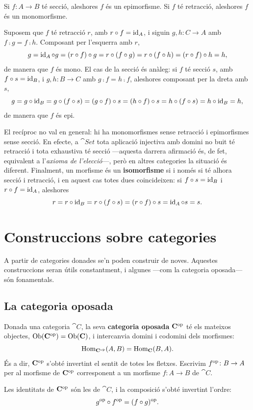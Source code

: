 \begin{proposicio}
Si $f\colon A\to B$ té secció, aleshores $f$ és un epimorfisme. Si $f$ té retracció, aleshores $f$ és un monomorfisme.
\end{proposicio}

\begin{prova}
Suposem que $f$ té retracció $r$, amb $r\circ f=\operatorname{id}_A$, i siguin $g,h\colon C\to A$ amb $f\comp g=f\comp h$. Composant per l'esquerra amb $r$,
\[
g=\operatorname{id}_A\circ g=(r\circ f)\circ g=r\circ(f\circ g)=r\circ(f\circ h)=(r\circ f)\circ h=h,
\]
de manera que $f$ és mono. El cas de la secció és anàleg: si $f$ té secció $s$, amb $f\circ s=\operatorname{id}_B$, i $g,h\colon B\to C$ amb $g\comp f=h\comp f$, aleshores composant per la dreta amb $s$,
\[
g=g\circ\operatorname{id}_B=g\circ(f\circ s)=(g\circ f)\circ s=(h\circ f)\circ s=h\circ(f\circ s)=h\circ\operatorname{id}_B=h,
\]
de manera que $f$ és epi.
\end{prova}

\begin{observacio}
El recíproc no val en general: hi ha monomorfismes sense retracció i epimorfismes sense secció. En efecte, a $\cat{Set}$ tota aplicació injectiva amb domini no buit té retracció i tota exhaustiva té secció ---aquesta darrera afirmació és, de fet, equivalent a l'\emph{axioma de l'elecció}---, però en altres categories la situació és diferent. Finalment, un morfisme és un \textbf{isomorfisme} si i només si té alhora secció i retracció, i en aquest cas totes dues coincideixen: si $f\circ s=\operatorname{id}_B$ i $r\circ f=\operatorname{id}_A$, aleshores
\[
r=r\circ\operatorname{id}_B=r\circ(f\circ s)=(r\circ f)\circ s=\operatorname{id}_A\circ s=s.
\]
\end{observacio}

\section{Construccions sobre categories}

A partir de categories donades se'n poden construir de noves. Aquestes construccions seran útils constantment, i algunes ---com la categoria oposada--- són fonamentals.

\subsection{La categoria oposada}

\begin{definicio}
Donada una categoria $\cat{C}$, la seva \textbf{categoria oposada} $\mathbf{C}^{\mathrm{op}}$ té els mateixos objectes, $\operatorname{Ob}(\mathbf{C}^{\mathrm{op}})=\operatorname{Ob}(\mathbf{C})$, i intercanvia domini i codomini dels morfismes:
\[
\operatorname{Hom}_{\mathbf{C}^{\mathrm{op}}}(A,B)=\operatorname{Hom}_{\mathbf{C}}(B,A).
\]
És a dir, $\mathbf{C}^{\mathrm{op}}$ s'obté invertint el sentit de totes les fletxes. Escrivim $f^{\mathrm{op}}\colon B\to A$ per al morfisme de $\mathbf{C}^{\mathrm{op}}$ corresponent a un morfisme $f\colon A\to B$ de $\cat{C}$.

Les identitats de $\mathbf{C}^{\mathrm{op}}$ són les de $\cat{C}$, i la composició s'obté invertint l'ordre:
\[
g^{\mathrm{op}}\circ f^{\mathrm{op}}=(f\circ g)^{\mathrm{op}}.
\]
\end{definicio}


